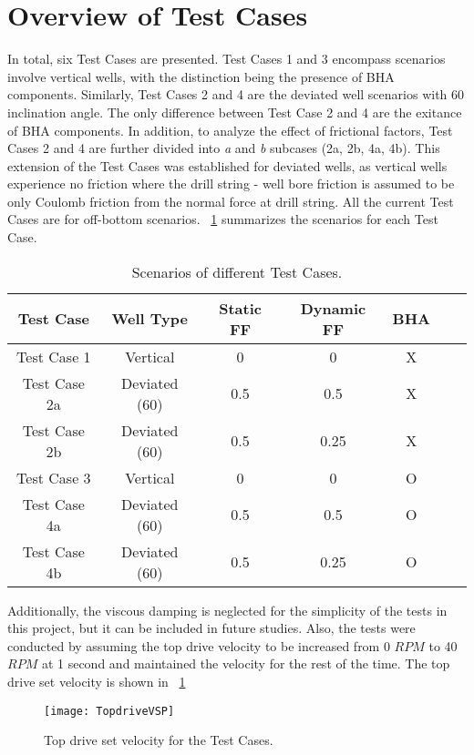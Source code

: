 \section{Overview of Test Cases}
In total, six Test Cases are presented. Test Cases 1 and 3 encompass scenarios involve vertical wells, with the distinction being the presence of BHA components. Similarly, Test Cases 2 and 4 are the deviated well scenarios with 60\textdegree{} inclination angle. The only difference between Test Case 2 and 4 are the exitance of BHA components. In addition, to analyze the effect of frictional factors, Test Cases 2 and 4 are further divided into \emph{a} and \emph{b} subcases (2a, 2b, 4a, 4b). This extension of the Test Cases was established for deviated wells, as vertical wells experience no friction where the drill string - well bore friction is assumed to be only Coulomb friction from the normal force at drill string. All the current Test Cases are for off-bottom scenarios.  \tablename~\ref{Test_case_summary} summarizes the scenarios for each Test Case. 
\begin{table}[!hbt]
    \centering
    \begin{tabular}{|c|c|c|c|c|c|c|}
        \hline
        \textbf{Test Case} & \textbf{Well Type} & \textbf{Static FF} & \textbf{Dynamic FF}& \textbf{BHA}\\
        \hline
        Test Case 1 & Vertical & 0 & 0 & X\\
        \hline
        Test Case 2a & Deviated (60\textdegree{}) & 0.5 & 0.5 & X \\
        \hline
        Test Case 2b & Deviated (60\textdegree{}) & 0.5 & 0.25 & X \\
        \hline
        Test Case 3 & Vertical & 0 & 0 & O\\                                                
        \hline
        Test Case 4a & Deviated (60\textdegree{}) & 0.5 & 0.5 & O \\                                                  
        \hline
        Test Case 4b & Deviated (60\textdegree{}) & 0.5 & 0.25 & O \\                                                     
        \hline
    \end{tabular}
    \caption[Scenarios of different Test Cases]{Scenarios of different Test Cases.}
    \label{Test_case_summary}
\end{table}
Additionally, the viscous damping is neglected for the simplicity of the tests in this project, but it can be included in future studies. Also, the tests were conducted by assuming the top drive velocity to be increased from 0 $RPM$ to 40 $RPM$ at 1 second and maintained the velocity for the rest of the time. The top drive set velocity is shown in \figurename~\ref{figure_topdrive_VSP}
\begin{figure}
  \centering
  \texttt{[image: TopdriveVSP]}
  \caption[Top drive set velocity for the Test Cases]{Top drive set velocity for the Test Cases.}\label{figure_topdrive_VSP}
\end{figure}

